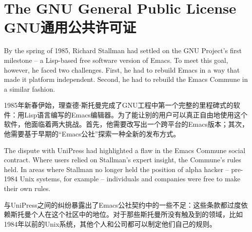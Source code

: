 

\chapter{\ifdefined\eng
The GNU General Public License
\fi
\ifdefined\chs
GNU通用公共许可证
\fi} \label{chapter:gpl}
\thispagestyle{empty}

\ifdefined\eng
By the spring of 1985, Richard Stallman had settled on the GNU Project's first milestone -- a Lisp-based free software version of Emacs. To meet this goal, however, he faced two challenges. First, he had to rebuild Emacs in a way that made it platform independent. Second, he had to rebuild the Emacs Commune in a similar fashion.
\fi

\ifdefined\chs
1985年新春伊始，理查德⋅斯托曼完成了GNU工程中第一个完整的里程碑式的软件：用Lisp语言编写的Emacs编辑器。为了能让别的用户可以真正自由地使用这个软件，他面临着两大挑战。首先，他需要改写出一个跨平台的Emacs版本；其次，他需要基于早期的``Emacs公社''探索一种全新的发布方式。
\fi

\ifdefined\eng
The dispute with UniPress had highlighted a flaw in the Emacs Commune social contract. Where users relied on Stallman's expert insight, the Commune's rules held. In areas where Stallman no longer held the position of alpha hacker -- pre-1984 Unix systems, for example -- individuals and companies were free to make their own rules.
\fi

\ifdefined\chs
与UniPress之间的纠纷暴露出了Emacs公社契约中的一些不足：这些条款都过度依赖斯托曼个人在这个社区中的地位。对于那些斯托曼所没有触及到的领域，比如1984年以前的Unix系统，其他个人和公司都可以制定他们自己的规则。
\fi

